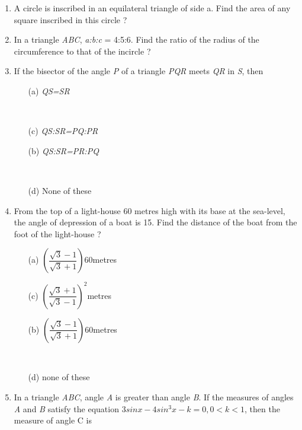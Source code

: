 \documentclass[journal,12pt,twocolumn]{IEEEtran}
\begin{document}
\begin{enumerate}
 \item A circle is inscribed in an equilateral triangle of side a. Find the area of any square inscribed in this circle ?
 \item In a triangle \textsl{ABC}, \textsl{a:b:c} = 4:5:6. Find the ratio of the radius of the circumference to that of the incircle ? 
 \item If the bisector of the angle \textsl{P} of a triangle \textsl{PQR} meets \textsl{QR} in \textsl{S}, then
 \begin{multicols}{2}
 \begin{itemize}
 \item[(a)] \textsl{QS=SR} \item[~]
 \item[(c)] \textsl{QS:SR=PQ:PR}
 \item[(b)] \textsl{QS:SR=PR:PQ}\item[~]
 \item[(d)] None of these
 \end{itemize}
 \end{multicols}
 \item From the top of a light-house 60 metres high with its base at the sea-level, the angle of depression of a boat is 15\degree. Find the distance of the boat from the foot of the light-house ? 
 \begin{multicols}{2}
 \begin{itemize}
 \item[(a)] $\left(\dfrac{\sqrt{3}-1}{\sqrt{3}+1}\right)$60metres
 \item[(c)] $\left(\dfrac{\sqrt{3}+1}{\sqrt{3}-1}\right)^2$metres
 \item[(b)] $\left(\dfrac{\sqrt{3}-1}{\sqrt{3}+1}\right)$60metres
 \item[~]
 \item[(d)] none of these
 \end{itemize}
 \end{multicols}
 \item In a triangle \textsl{ABC}, angle \textsl{A} is greater than angle \textsl{B}. If the measures of angles \textsl{A} and \textsl{B} satisfy the equation $3sinx-4sin^3x-k=0, 0<k<1$, then the measure of angle C is
 \begin{itemize}
\end{itemize}
\end{enumerate}
\end{document}
